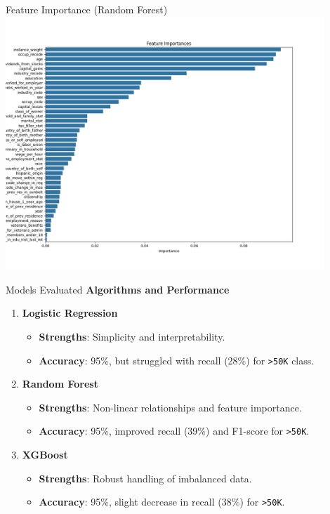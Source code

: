 \documentclass{beamer}
\begin{document}
\begin{frame}{Feature Importance (Random Forest)}
	\includegraphics[width=0.9\textwidth]{Figure_1.png}
\end{frame}

\begin{frame}{Models Evaluated}
	\textbf{Algorithms and Performance}
	\begin{enumerate}
		\item \textbf{Logistic Regression}
			\begin{itemize}
				\item \textbf{Strengths}: Simplicity and interpretability.
				\item \textbf{Accuracy}: 95\%, but struggled with recall (28\%) for \texttt{>50K} class.
			\end{itemize}
		\item \textbf{Random Forest}
			\begin{itemize}
				\item \textbf{Strengths}: Non-linear relationships and feature importance.
				\item \textbf{Accuracy}: 95\%, improved recall (39\%) and F1-score for \texttt{>50K}.
			\end{itemize}
		\item \textbf{XGBoost}
			\begin{itemize}
				\item \textbf{Strengths}: Robust handling of imbalanced data.
				\item \textbf{Accuracy}: 95\%, slight decrease in recall (38\%) for \texttt{>50K}.
			\end{itemize}
	\end{enumerate}
\end{frame}
\end{document}
